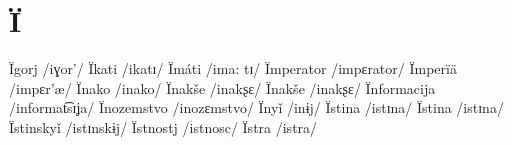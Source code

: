 \chapter{Ï}

Ïgorj /iɣor’/
Ïkati /ikatɪ/
Ïmáti /ima: tɪ/
Ïmperator /impɛrator/
Ïmperïä /impɛr’æ/
Ïnako /inako/
Ïnakše /inakʂɛ/
Ïnakše /inakʂɛ/
Ïnformacija /informat͡sɪʝa/
Ïnozemstvo /inozɛmstvo/
Ïnyǐ /inɨj/
Ïstina /istɪna/
Ïstina /istɪna/
Ïstinskyǐ /istɪnskɨj/
Ïstnostj /istnosc/
Ïstra /istra/